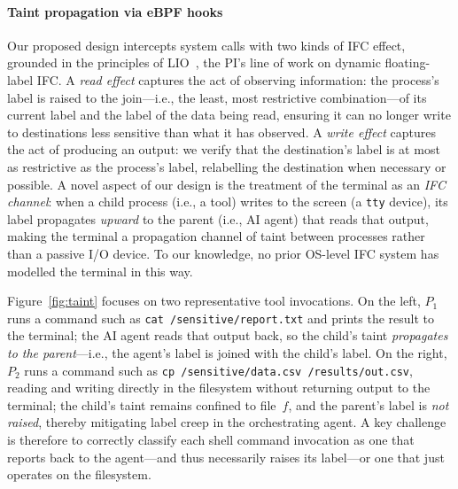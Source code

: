 \documentclass{kaw}
\begin{document}
\paragraph{Taint propagation via eBPF hooks}
Our proposed design intercepts system calls with two kinds of IFC effect,
grounded in the principles of LIO~\cite{stefan:lio,Stefan:LIO:JFP16,Buiras:2015},
the PI's line of work on dynamic floating-label IFC.
%
A \emph{read effect} captures the act of observing information: the
process's label is raised to the join---i.e., the least, most restrictive
combination---of its current label and the label of the data being read,
ensuring it can no longer write to destinations less sensitive than what it
has observed.
%
A \emph{write effect} captures the act of producing an output: we verify that
the destination's label is at most as restrictive as the process's label,
relabelling the destination when necessary or possible.
%
A novel aspect of our design is the treatment of the terminal as an \emph{IFC
channel}: when a child process (i.e., a tool) writes to the screen (a
\texttt{tty} device), its label propagates \emph{upward} to the parent (i.e., AI agent)
that reads that output, making the terminal a propagation channel of taint
between processes rather than a passive I/O device.
%
To our knowledge, no prior OS-level IFC system has modelled the terminal in
this way. 
%

Figure~\ref{fig:taint} focuses on two representative tool invocations.
%
On the left, $P_1$ runs a command such as \texttt{cat /sensitive/report.txt}
and prints the result to the terminal; the AI agent reads that output back,
so the child's taint \emph{propagates to the parent}---i.e., the agent's label is
joined with the child's label.
%
On the right, $P_2$ runs a command such as
\texttt{cp /sensitive/data.csv /results/out.csv}, reading and writing
directly in the filesystem without returning output to the terminal;
the child's taint remains confined to file~$f$, and the parent's label
is \emph{not raised}, thereby mitigating label creep in the orchestrating agent.
%
A key challenge is therefore to correctly classify each shell command invocation
as one that reports back to the agent---and thus necessarily raises its label---or
one that just operates on the filesystem. 
\end{document}
